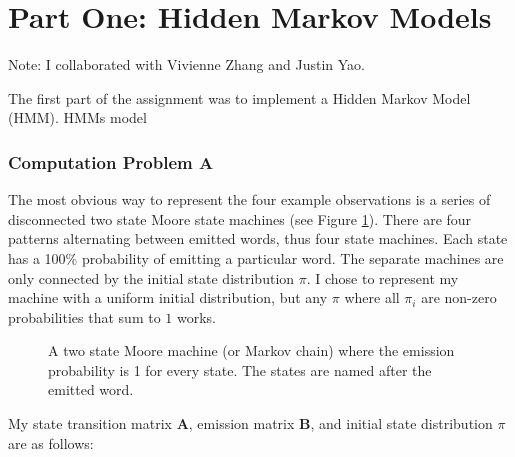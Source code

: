 \chapter*{Part One: Hidden Markov Models}

Note: I collaborated with Vivienne Zhang and Justin Yao.

The first part of the assignment was to implement a Hidden Markov Model (HMM). HMMs model

\subsection*{Computation Problem A}

The most obvious way to represent the four example observations is a series of disconnected two state Moore state machines (see Figure \ref{moore}). There are four patterns alternating between emitted words, thus four state machines. Each state has a 100\% probability of emitting a particular word. The separate machines are only connected by the initial state distribution $\pi$. I chose to represent my machine with a uniform initial distribution, but any $\pi$ where all $\pi_i$ are non-zero probabilities that sum to $1$ works.

\begin{figure}[h]

    \centering
    \caption{A two state Moore machine (or Markov chain) where the emission probability is 1 for every state. The states are named after the emitted word. }
    \label{moore}
\end{figure}

My state transition matrix $\bm{A}$, emission matrix $\bm{B}$, and initial state distribution $\pi$ are as follows:

